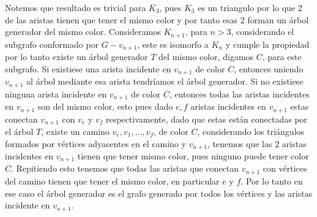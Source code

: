 \documentclass[a4paper,oneside,10.5pt]{USMArt}
\begin{document}
\begin{sol}
  Notemos que resultado es trivial para $K_{3}$, pues $K_{3}$ es un triangulo por lo que 2 de las aristas tienen
  que tener el mismo color y por tanto esas 2 forman un árbol generador del mismo color. Consideramos $K_{n + 1}$, para
  $n > 3$, considerando el subgrafo conformado por $G - v_{n + 1}$, este es isomorfo a $K_{n}$ y cumple la propiedad
  por lo tanto existe un árbol generador $T$ del mismo color, digamos $C$, para este subgrafo. Si existiese una arista
  incidente en $v_{n + 1}$ de color $C$, entonces uniendo $v_{n + 1}$ al árbol mediante esa arista tendríamos el árbol
  generador. Si no existiese ninguna arista incidente en $v_{n + 1}$ de color $C$, entonces todas las aristas incidentes
  en $v_{n + 1}$ son del mismo color, esto pues dado $e, f$ aristas incidentes en $v_{n + 1}$ estas conectan
  $v_{n + 1}$ con $v_{e}$ y $v_{f}$ respectivamente, dado que estas están conectadas por el árbol $T$, existe un camino
  $v_{e}, v_{1}, \dots, v_{f}$, de color $C$, considerando los triángulos formados por vértices
  adyacentes en el camino y $v_{n + 1}$, tenemos que las $2$ aristas incidentes en $v_{n + 1}$ tienen que tener mismo
  color, pues ninguno puede tener color $C$. Repitiendo esto tenemos que todas las aristas que conectan $v_{n + 1}$
  con vértices del camino tienen que tener el mismo color, en particular $e$ y $f$. Por lo tanto en ese caso
  el árbol generador es el grafo generado por todos los vértices y las aristas incidente en $v_{n + 1}$.
\end{sol}
\end{document}
